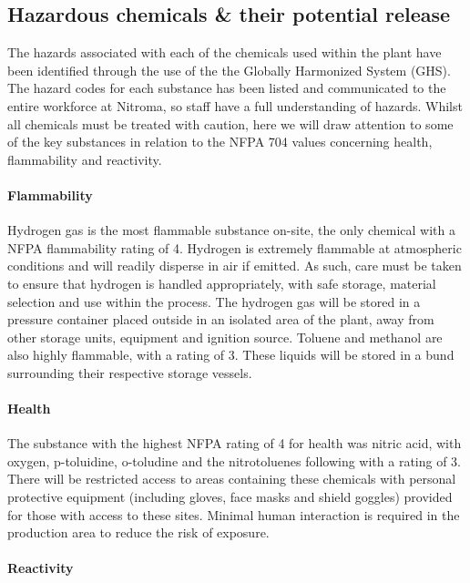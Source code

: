 

\subsection{Hazardous chemicals \& their potential release}

The hazards associated with each of the chemicals used within the plant have  been identified through the use of the the Globally Harmonized System (GHS). The hazard codes for each substance has been listed and communicated to the entire workforce at Nitroma, so staff have a full understanding of hazards. Whilst all chemicals must be treated with caution, here we will draw attention to some of the key substances in relation to the NFPA 704 values concerning health, flammability and reactivity. 

\paragraph{Flammability}

Hydrogen gas is the most flammable substance on-site, the only chemical with a NFPA flammability rating of 4.  Hydrogen is extremely flammable at atmospheric conditions and will readily disperse in air if emitted. As such, care must be taken to ensure that hydrogen is handled appropriately, with safe storage, material selection and use within the process. The hydrogen gas will be stored in a pressure container placed outside in an isolated area of the plant, away from other storage units, equipment and ignition source.  Toluene and methanol are also highly flammable, with a rating of 3. These liquids will be stored in a bund surrounding their respective storage vessels. 



\paragraph{Health}

The substance with the highest NFPA rating of 4 for health was nitric acid, with oxygen, p-toluidine, o-toludine and the nitrotoluenes  following with a rating of 3. There will be restricted access to areas containing these chemicals with personal protective equipment (including gloves, face masks and shield goggles) provided for those with access to these sites. Minimal human interaction is required in the production area to reduce the risk of exposure.

\paragraph{Reactivity}

